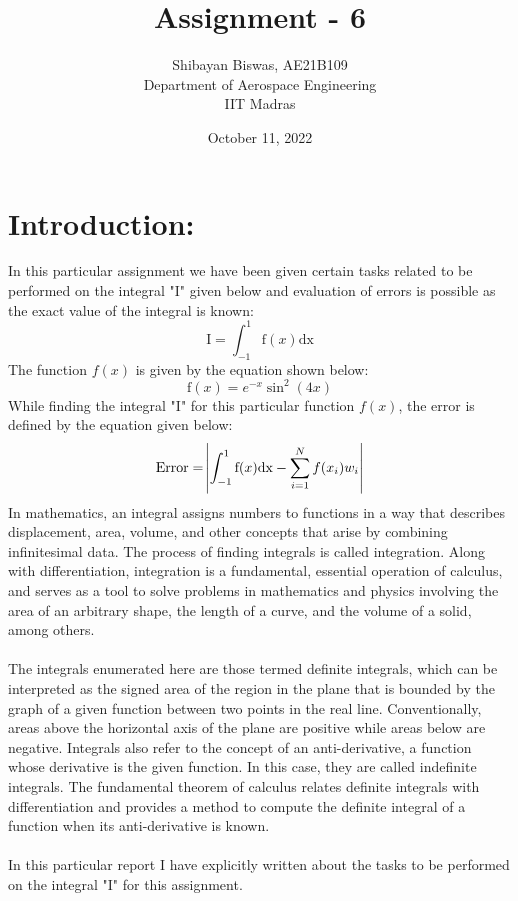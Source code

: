 \documentclass[12pt,a4paper]{article}
\author{ Shibayan Biswas, AE21B109\\ Department of Aerospace Engineering\\ IIT Madras}
\title{Assignment - 6}
\date{October 11, 2022}
\begin{document}
\maketitle
\hline
\section{Introduction:}
In this particular assignment we have been given certain tasks related to be performed on the integral "I" given below and evaluation of errors is possible as the exact value of the integral is known:
\begin{equation}
	\text{I} = \int_{-1}^{1}{ \text{f}(x) \text{dx}}
\end{equation}
The function $f(x)$ is given by the equation shown below:
\begin{equation}
    \text{f}(x) = \text{$e^{-x}$} \text{$\sin^2(4x)$}
\end{equation}
While finding the integral "I" for this particular function $f(x)$, the error is defined by the equation given below:
\begin{equation}
    \text{Error} = \abs{\text{$\int_{-1}^{1}{ \text{f}(x) \text{dx}} - \sum_{i=1}^{N} \text{$f$}(x_i) \text{$w_i$}$}}
\end{equation}
In mathematics, an integral assigns numbers to functions in a way that describes displacement, area, volume, and other concepts that arise by combining infinitesimal data. The process of finding integrals is called integration. Along with differentiation, integration is a fundamental, essential operation of calculus, and serves as a tool to solve problems in mathematics and physics involving the area of an arbitrary shape, the length of a curve, and the volume of a solid, among others.\\
\\The integrals enumerated here are those termed definite integrals, which can be interpreted as the signed area of the region in the plane that is bounded by the graph of a given function between two points in the real line. Conventionally, areas above the horizontal axis of the plane are positive while areas below are negative. Integrals also refer to the concept of an anti-derivative, a function whose derivative is the given function. In this case, they are called indefinite integrals. The fundamental theorem of calculus relates definite integrals with differentiation and provides a method to compute the definite integral of a function when its anti-derivative is known.\\
\\In this particular report I have explicitly written about the tasks to be performed on the integral "I" for this assignment.
\clearpage
\end{document}
